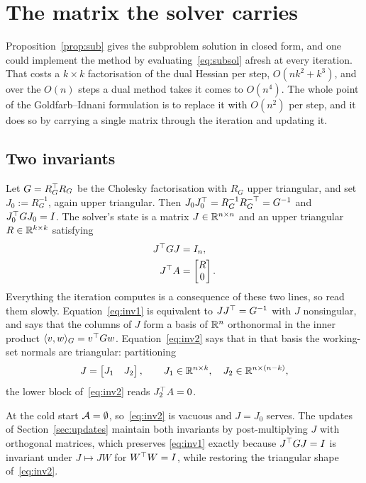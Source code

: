 \section{The matrix the solver carries}
\label{sec:factorisation}

Proposition~\ref{prop:sub} gives the subproblem solution in closed form, and one
could implement the method by evaluating~\eqref{eq:subsol} afresh at every
iteration. That costs a $k \times k$ factorisation of the dual Hessian per step,
$O(nk^2 + k^3)$, and over the $O(n)$ steps a dual method takes it comes to
$O(n^4)$. The whole point of the Goldfarb--Idnani formulation is to replace it
with $O(n^2)$ per step, and it does so by carrying a single matrix through the
iteration and updating it.

\subsection{Two invariants}

Let $G = R_G^{\top} R_G$ be the Cholesky factorisation with $R_G$ upper triangular,
and set $J_0 := R_G^{-1}$, again upper triangular. Then
$J_0 J_0^{\top} = R_G^{-1} R_G^{-\top} = G^{-1}$ and $J_0^{\top} G J_0 = I$. The solver's
state is a matrix $J \in \mathbb{R}^{n \times n}$ and an upper triangular
$R \in \mathbb{R}^{k \times k}$ satisfying
\begin{align}
  J^{\top} G J &= I_n, \label{eq:inv1}\\
  J^{\top} A &= \begin{bmatrix} R \\ 0 \end{bmatrix}. \label{eq:inv2}
\end{align}
Everything the iteration computes is a consequence of these two lines, so read
them slowly. Equation~\eqref{eq:inv1} is equivalent to
$J J^{\top} = G^{-1}$ with $J$ nonsingular, and says that the columns of $J$ form a
basis of $\mathbb{R}^n$ orthonormal in the inner product $\langle v,w\rangle_G = v^{\top} G w$.
Equation~\eqref{eq:inv2} says that in that basis the working-set normals are
triangular: partitioning
\begin{equation}
  J = \begin{bmatrix} J_1 & J_2 \end{bmatrix},
  \qquad J_1 \in \mathbb{R}^{n \times k},\quad J_2 \in \mathbb{R}^{n \times (n-k)},
  \label{eq:split}
\end{equation}
the lower block of~\eqref{eq:inv2} reads $J_2^{\top} A = 0$.

At the cold start $\mathcal{A} = \emptyset$, so~\eqref{eq:inv2} is vacuous and
$J = J_0$ serves. The updates of Section~\ref{sec:updates} maintain both
invariants by post-multiplying $J$ with orthogonal matrices, which preserves
\eqref{eq:inv1} exactly because $J^{\top} G J = I$ is invariant under $J \mapsto JW$
for $W^{\top} W = I$, while restoring the triangular shape of~\eqref{eq:inv2}.

